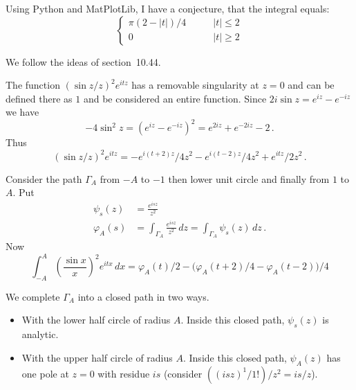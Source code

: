\begin{enumerate}
Using Python and MatPlotLib, I have a conjecture, that the integral equals:
\begin{equation*}
\left\{\begin{array}{ll} %
\pi(2-|t|)/4 \qquad & |t| \leq 2 \\
0 & |t| \geq 2
\end{array}\right.
\end{equation*}

We follow the ideas of section~10.44.

The function \((\sin z/z)^2 e^{itz}\) has a removable singularity at \(z=0\)
and can be defined there as $1$ and be considered an entire function.
Since \(2i \sin z = e^{iz} - e^{-iz}\) we have
\begin{equation*}
-4\sin^2 z = \left(e^{iz} - e^{-iz}\right)^2 = e^{2iz} + e^{-2iz} - 2\,.
\end{equation*}
Thus
\begin{equation*}
(\sin z/z)^2 e^{itz} = -e^{i(t+2)z}/4z^2 - e^{i(t-2)z}/4z^2 + e^{itz}/2z^2\,.
\end{equation*}

Consider the path \(\Gamma_A\) from \(-A\) to \(-1\)
then lower unit circle and finally from $1$ to $A$.
Put
\begin{align*}
\psi_s(z) &= \frac{e^{isz}}{z^2} \\
\varphi_A(s) 
  &= \int_{\Gamma_A} \frac{e^{isz}}{z^2}\,dz
  = \int_{\Gamma_A} \psi_s(z)\,dz\,.
\end{align*}
Now
\begin{equation} \label{eq:10.12:sin2phis}
\int_{-A}^A \left(\frac{\sin x}{x}\right)^2 e^{itx}\,dx
= \varphi_A(t)/2 - \bigl(\varphi_A(t+2)/4 - \varphi_A(t-2)\bigr)/4 
\end{equation}

We complete \(\Gamma_A\) into a closed path in two ways.
\begin{itemize}
\item With the lower half circle of radius $A$. Inside this closed path, 
      \(\psi_s(z)\) is analytic.
\item With the upper half circle of radius $A$. Inside this closed path, 
      \(\psi_A(z)\) has one pole at \(z=0\)
      with residue \(is\) (consider \(((isz)^1/1!)/z^2 = is/z\)).
\end{itemize}


\end{enumerate}
